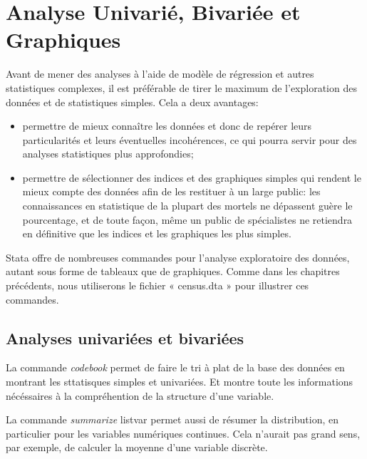 \documentclass[
]{book}
\providecommand{\tightlist}{%
  \setlength{\itemsep}{0pt}\setlength{\parskip}{0pt}}
\begin{document}
\hypertarget{analyse-univariuxe9-bivariuxe9e-et-graphiques}{%
\chapter{Analyse Univarié, Bivariée et Graphiques}\label{analyse-univariuxe9-bivariuxe9e-et-graphiques}}

Avant de mener des analyses à l'aide de modèle de régression et
autres statistiques complexes, il est préférable de tirer le
maximum de l'exploration des données et de statistiques
simples. Cela a deux avantages:

\begin{itemize}
\tightlist
\item
  permettre de mieux connaître les données et donc de repérer
  leurs particularités et leurs éventuelles incohérences, ce qui
  pourra servir pour des analyses statistiques plus
  approfondies;
\item
  permettre de sélectionner des indices et des graphiques
  simples qui rendent le mieux compte des données afin de les
  restituer à un large public: les connaissances en statistique de
  la plupart des mortels ne dépassent guère le pourcentage, et
  de toute façon, même un public de spécialistes ne retiendra en
  définitive que les indices et les graphiques les plus simples.
\end{itemize}

Stata offre de nombreuses commandes pour l'analyse
exploratoire des données, autant sous forme de tableaux que de
graphiques. Comme dans les chapitres précédents, nous
utiliserons le fichier « census.dta » pour illustrer ces
commandes.

\hypertarget{analyses-univariuxe9es-et-bivariuxe9es}{%
\section{Analyses univariées et bivariées}\label{analyses-univariuxe9es-et-bivariuxe9es}}

La commande \emph{codebook} permet de faire le tri à plat de la base des données en montrant les sttatisques simples et univariées. Et montre toute les informations nécéssaires à la compréhention de la structure d'une variable.

La commande \emph{summarize} listvar permet aussi de résumer
la distribution, en particulier pour les variables numériques
continues. Cela n'aurait pas grand sens, par exemple, de calculer
la moyenne d'une variable discrète.
\end{document}
